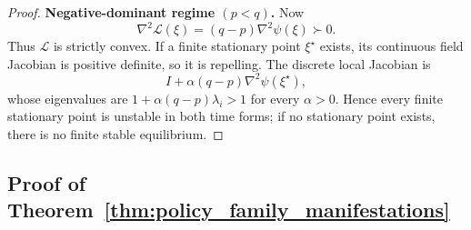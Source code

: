 \documentclass{article}
\theoremstyle{plain}
\theoremstyle{definition}
\theoremstyle{remark}
\begin{document}
\begin{proof}
\medskip
\noindent\textbf{Negative-dominant regime \((p<q)\).}
Now
\[
\nabla^2\mathcal L(\xi)
=
(q-p)\nabla^2\psi(\xi)
\succ0.
\]
Thus \(\mathcal L\) is strictly convex. If a finite stationary point
\(\xi^\star\) exists, its continuous field Jacobian is positive
definite, so it is repelling. The discrete local Jacobian is
\[
I+\alpha(q-p)\nabla^2\psi(\xi^\star),
\]
whose eigenvalues are
\(1+\alpha(q-p)\lambda_i>1\) for every \(\alpha>0\).
Hence every finite stationary point is unstable in both time forms; if
no stationary point exists, there is no finite stable equilibrium.
\end{proof}

\subsection{Proof of
Theorem~\ref{thm:policy_family_manifestations}}
\label{app:policy_family_manifestations}
\end{document}
